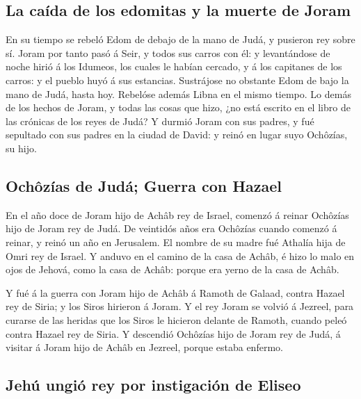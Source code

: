 \hypertarget{la-cauxedda-de-los-edomitas-y-la-muerte-de-joram}{%
\subsection{La caída de los edomitas y la muerte de
Joram}\label{la-cauxedda-de-los-edomitas-y-la-muerte-de-joram}}

 En su tiempo se rebeló Edom de debajo de la mano de
Judá, y pusieron rey sobre sí.  Joram por tanto pasó á
Seir, y todos sus carros con él: y levantándose de noche hirió á los
Idumeos, los cuales le habían cercado, y á los capitanes de los carros:
y el pueblo huyó á sus estancias.  Sustrájose no obstante
Edom de bajo la mano de Judá, hasta hoy. Rebelóse además Libna en el
mismo tiempo.  Lo demás de los hechos de Joram, y todas
las cosas que hizo, ¿no está escrito en el libro de las crónicas de los
reyes de Judá?  Y durmió Joram con sus padres, y fué
sepultado con sus padres en la ciudad de David: y reinó en lugar suyo
Ochôzías, su hijo.

\hypertarget{ochuxf4zuxedas-de-juduxe1-guerra-con-hazael}{%
\subsection{Ochôzías de Judá; Guerra con
Hazael}\label{ochuxf4zuxedas-de-juduxe1-guerra-con-hazael}}

 En el año doce de Joram hijo de Achâb rey de Israel,
comenzó á reinar Ochôzías hijo de Joram rey de Judá.  De
veintidós años era Ochôzías cuando comenzó á reinar, y reinó un año en
Jerusalem. El nombre de su madre fué Athalía hija de Omri rey de Israel.
 Y anduvo en el camino de la casa de Achâb, é hizo lo
malo en ojos de Jehová, como la casa de Achâb: porque era yerno de la
casa de Achâb.

 Y fué á la guerra con Joram hijo de Achâb á Ramoth de
Galaad, contra Hazael rey de Siria; y los Siros hirieron á Joram.
 Y el rey Joram se volvió á Jezreel, para curarse de las
heridas que los Siros le hicieron delante de Ramoth, cuando peleó contra
Hazael rey de Siria. Y descendió Ochôzías hijo de Joram rey de Judá, á
visitar á Joram hijo de Achâb en Jezreel, porque estaba enfermo.

\hypertarget{jehuxfa-ungiuxf3-rey-por-instigaciuxf3n-de-eliseo}{%
\subsection{Jehú ungió rey por instigación de
Eliseo}\label{jehuxfa-ungiuxf3-rey-por-instigaciuxf3n-de-eliseo}}


